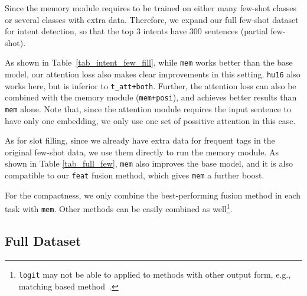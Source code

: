 Since the memory module requires to be trained on either many few-shot classes or several classes with extra data.
Therefore, we expand our full few-shot dataset for intent detection, so that the top 3 intents have 300 sentences (partial few-shot).

As shown in Table~\ref{tab_intent_few_fill}, while \texttt{mem} works better than the base model, our attention loss also makes clear improvements in this setting.
\texttt{hu16} also works here, but is inferior to \texttt{t\_att+both}.
Further, the attention loss can also be combined with the memory module (\texttt{mem+posi}), and achieves better results than \texttt{mem} alone. 
Note that, since the attention module requires the input sentence to have only one embedding, we only use one set of possitive attention in this case.

As for slot filling, since we already have extra data for frequent tags in the original few-shot data, we use them directly to run the memory module. As shown in Table \ref{tab_full_few}, \texttt{mem} also improves the base model, and it is also compatible to our \texttt{feat} fusion method, which gives \texttt{mem} a further boost.

For the compactness, we only combine the best-performing fusion method in each task with \texttt{mem}. Other methods can be easily combined as well\footnote{
\texttt{logit} may not be able to applied to methods with other output form, e.g., matching based method~\cite{koch2015siamese}.}.



\subsection{Full Dataset}

